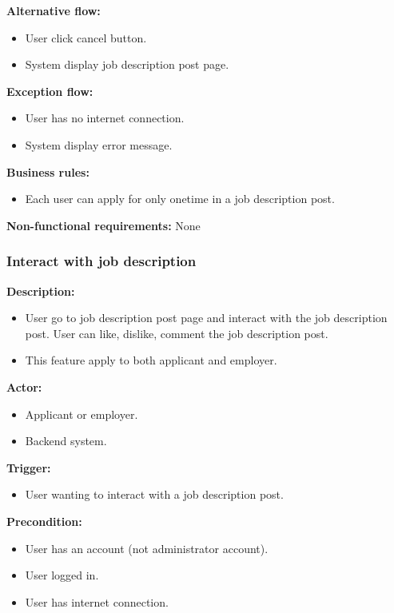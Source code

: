 \documentclass[a4paper]{article}
\begin{document}
\textbf{Alternative flow:}
\begin{itemize}
  \item User click cancel button.
  \item System display job description post page.
\end{itemize}

\textbf{Exception flow:}
\begin{itemize}
  \item User has no internet connection.
  \item System display error message.
\end{itemize}

\textbf{Business rules:}
\begin{itemize}
  \item Each user can apply for only onetime in a job description post.
\end{itemize}

\textbf{Non-functional requirements:}
None

\subsubsection{Interact with job description}
\textbf{Description:}
\begin{itemize}
  \item User go to job description post page and interact with the job description post. User can like, dislike, comment the job description post.
  \item This feature apply to both applicant and employer.
\end{itemize}

\textbf{Actor:}
\begin{itemize}
  \item Applicant or employer.
  \item Backend system.
\end{itemize}

\textbf{Trigger:}
\begin{itemize}
  \item User wanting to interact with a job description post.
\end{itemize}

\textbf{Precondition:}
\begin{itemize}
  \item User has an account (not administrator account).
  \item User logged in.
  \item User has internet connection.
\end{itemize}
\end{document}
